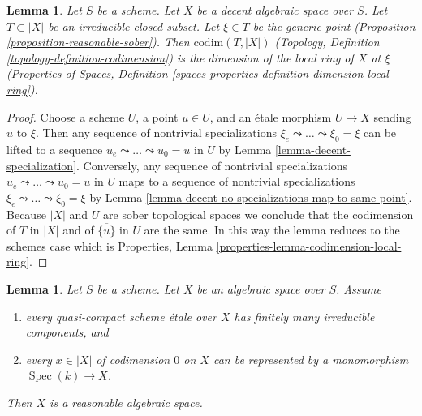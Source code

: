 \documentclass{stacks-project}
\theoremstyle{plain}
\newtheorem{lemma}[subsection]{Lemma}
\theoremstyle{definition}
\theoremstyle{remark}
\numberwithin{equation}{subsection}
\def\Spec{\mathop{\mathrm{Spec}}}
\begin{document}
\begin{lemma}
\label{lemma-codimension-local-ring}
Let $S$ be a scheme. Let $X$ be a decent algebraic space over $S$.
Let $T \subset |X|$ be an irreducible closed subset. Let $\xi \in T$
be the generic point (Proposition \ref{proposition-reasonable-sober}).
Then $\text{codim}(T, |X|)$
(Topology, Definition \ref{topology-definition-codimension})
is the dimension of the local ring of $X$ at $\xi$
(Properties of Spaces, Definition
\ref{spaces-properties-definition-dimension-local-ring}).
\end{lemma}

\begin{proof}
Choose a scheme $U$, a point $u \in U$, and an \'etale morphism
$U \to X$ sending $u$ to $\xi$. Then any sequence of nontrivial
specializations $\xi_e \leadsto \ldots \leadsto \xi_0 = \xi$
can be lifted to a sequence $u_e \leadsto \ldots \leadsto u_0 = u$ in $U$
by Lemma \ref{lemma-decent-specialization}.
Conversely, any sequence of nontrivial specializations
$u_e \leadsto \ldots \leadsto u_0 = u$ in $U$
maps to a sequence of nontrivial specializations
$\xi_e \leadsto \ldots \leadsto \xi_0 = \xi$ by
Lemma \ref{lemma-decent-no-specializations-map-to-same-point}.
Because $|X|$ and $U$ are sober topological spaces
we conclude that the codimension of $T$ in $|X|$
and of $\overline{\{u\}}$ in $U$ are the same.
In this way the lemma reduces to the schemes case which
is Properties, Lemma \ref{properties-lemma-codimension-local-ring}.
\end{proof}

\begin{lemma}
\label{lemma-get-reasonable}
Let $S$ be a scheme. Let $X$ be an algebraic space over $S$. Assume
\begin{enumerate}
\item every quasi-compact scheme \'etale over $X$ has finitely many
irreducible components, and
\item every $x \in |X|$ of codimension $0$ on $X$ can be represented
by a monomorphism $\Spec(k) \to X$.
\end{enumerate}
Then $X$ is a reasonable algebraic space.
\end{lemma}
\end{document}
